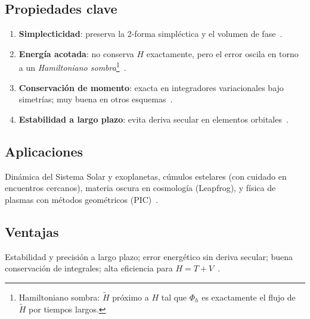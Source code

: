 \subsection{Propiedades clave}
\begin{enumerate}
  \item \textbf{Simplecticidad}: preserva la 2-forma simpléctica y el volumen de fase~\cite{stuchi2002, farr2007}.
  \item \textbf{Energía acotada}: no conserva $H$ exactamente, pero el error oscila en torno a un \emph{Hamiltoniano sombra}\footnote{%
  Hamiltoniano sombra: $\tilde H$ próximo a $H$ tal que $\Phi_h$ es exactamente el flujo de $\tilde H$ por tiempos largos.}~\cite{yoshida1993, hernandez2019b}.
  \item \textbf{Conservación de momento}: exacta en integradores variacionales bajo simetrías; muy buena en otros esquemas~\cite{farr2007, Hernandez2015}.
  \item \textbf{Estabilidad a largo plazo}: evita deriva secular en elementos orbitales~\cite{wisdom1991, yoshida1993}.
\end{enumerate}

\subsection{Aplicaciones}
Dinámica del Sistema Solar y exoplanetas, cúmulos estelares (con cuidado en encuentros cercanos), materia oscura en cosmología (Leapfrog), y física de plasmas con métodos geométricos (PIC)~\cite{wisdom1991, stuchi2002, rebound_doc, hernandez2020, glasser2022}.

\subsection{Ventajas}
Estabilidad y precisión a largo plazo; error energético sin deriva secular; buena conservación de integrales; alta eficiencia para $H=T+V$~\cite{wisdom1991, yoshida1993, stuchi2002, Hernandez2015}.

